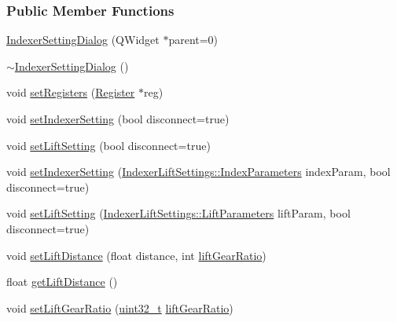 \subsubsection*{Public Member Functions}
\begin{DoxyCompactItemize}
\item 
\mbox{\hyperlink{classIndexerSettingDialog_ad2c64f92d2d17bc3d8045dd84eeb71e8}{Indexer\+Setting\+Dialog}} (Q\+Widget $\ast$parent=0)
\item 
\mbox{\hyperlink{classIndexerSettingDialog_a87b6ba4152cb2b6a02a93e502d7b64ff}{$\sim$\+Indexer\+Setting\+Dialog}} ()
\item 
void \mbox{\hyperlink{classIndexerSettingDialog_a2b0fb04ec9698b7bc82a69ae3d379a1b}{set\+Registers}} (\mbox{\hyperlink{classRegister}{Register}} $\ast$reg)
\item 
void \mbox{\hyperlink{classIndexerSettingDialog_a3b3ff00a9731a94931be5f2c9590fa37}{set\+Indexer\+Setting}} (bool disconnect=true)
\item 
void \mbox{\hyperlink{classIndexerSettingDialog_ae98cd594c5da327549e306a2ec09718e}{set\+Lift\+Setting}} (bool disconnect=true)
\item 
void \mbox{\hyperlink{classIndexerSettingDialog_aea4b170b962c7e2e319565f3fde73b14}{set\+Indexer\+Setting}} (\mbox{\hyperlink{classIndexerLiftSettings_a6b75f15b6abc72b9070642cb8b5408ca}{Indexer\+Lift\+Settings\+::\+Index\+Parameters}} index\+Param, bool disconnect=true)
\item 
void \mbox{\hyperlink{classIndexerSettingDialog_aa8ef316cb26c8c1c2149581679ca9646}{set\+Lift\+Setting}} (\mbox{\hyperlink{classIndexerLiftSettings_a83fd6fc58021bc526b681c1ce840f686}{Indexer\+Lift\+Settings\+::\+Lift\+Parameters}} lift\+Param, bool disconnect=true)
\item 
void \mbox{\hyperlink{classIndexerSettingDialog_a12036cd566ddbb3581bf7a526bf0d18f}{set\+Lift\+Distance}} (float distance, int \mbox{\hyperlink{classIndexerSettingDialog_a9dfafe2970aeba611a1736a3797cc3f3}{lift\+Gear\+Ratio}})
\item 
float \mbox{\hyperlink{classIndexerSettingDialog_a436f30e8ab3af6ea4b3a2389c6711fd4}{get\+Lift\+Distance}} ()
\item 
void \mbox{\hyperlink{classIndexerSettingDialog_a3b2f9533b1c72aecd3d36bb4d175859f}{set\+Lift\+Gear\+Ratio}} (\mbox{\hyperlink{settings_8h_a4196118492a3b1493c81f250e90af775}{uint32\+\_\+t}} \mbox{\hyperlink{classIndexerSettingDialog_a9dfafe2970aeba611a1736a3797cc3f3}{lift\+Gear\+Ratio}})
\end{DoxyCompactItemize}
